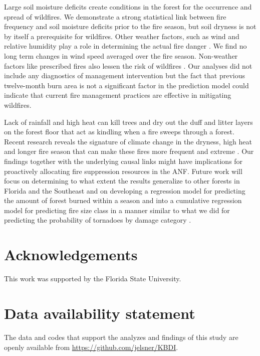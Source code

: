 \documentclass[12pt]{iopart}
\begin{document}
Large soil moisture deficits create conditions in the forest for the occurrence and spread of wildfires. We demonstrate a strong statistical link between fire frequency and soil moisture deficits prior to the fire season, but soil dryness is not by itself a prerequisite for wildfires. Other weather factors, such as wind and relative humidity play a role in determining the actual fire danger \citep{LiuEtAl2013}. We find no long term changes in wind speed averaged over the fire season. Non-weather factors like prescribed fires also lessen the risk of wildfires \citep{AddingtonEtAl2015}. Our analyses did not include any diagnostics of management intervention but the fact that previous twelve-month burn area is not a significant factor in the prediction model could indicate that current fire management practices are effective in mitigating wildfires. 

Lack of rainfall and high heat can kill trees and dry out the duff and litter layers on the forest floor that act as kindling when a fire sweeps through a forest. Recent research reveals the signature of climate change in the dryness, high heat and longer fire season that can make these fires more frequent and extreme \citep{BrownEtAl2021,GossEtAl2020}. Our findings together with the underlying causal links might have implications for proactively allocating fire suppression resources \citep{KoldenBrown2010,TurcoEtAl2019} in the ANF. Future work will focus on determining to what extent the results generalize to other forests in Florida and the Southeast and on developing a regression model for predicting the amount of forest burned within a season and into a cumulative regression model for predicting fire size class in a manner similar to what we did for predicting the probability of tornadoes by damage category \citep{ElsnerSchroder2019}.


\section*{Acknowledgements}
This work was supported by the Florida State University.

\section*{Data availability statement}
The data and codes that support the analyzes and findings of this study are openly available from \url{https://github.com/jelsner/KBDI}.

\newpage

\end{document}
